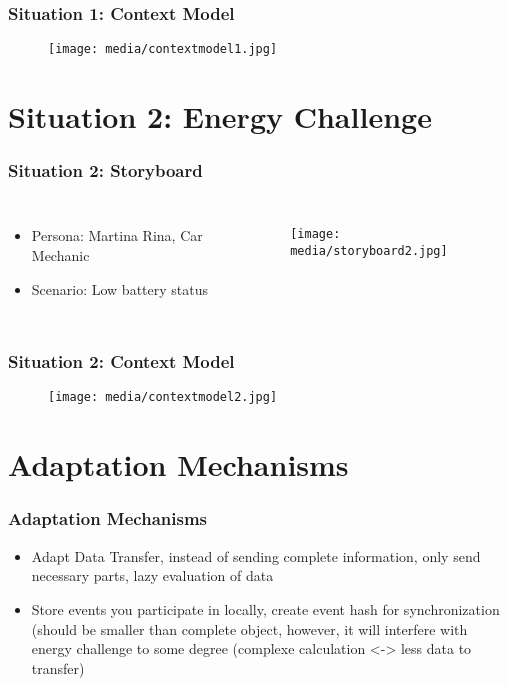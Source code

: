 \documentclass[aspectratio=169]{beamer}
\begin{document}
\begin{frame}
	\frametitle{Situation 1: Context Model}
	 \begin{figure}
		\centering
		\texttt{[image: media/contextmodel1.jpg]}
	\end{figure}
\end{frame}




\section{Situation 2:  Energy Challenge}
\begin{frame}   
	\frametitle{Situation 2:  Storyboard}
	\begin{columns}
		\begin{itemize}
			\item Persona: Martina Rina, Car Mechanic
			\item Scenario: Low battery status
		\end{itemize}
		 \begin{figure}
			\centering
			\texttt{[image: media/storyboard2.jpg]}
		\end{figure}
	\end{columns}
\end{frame}

\begin{frame}
	\frametitle{Situation 2: Context Model}
	 \begin{figure}
		\centering
		\texttt{[image: media/contextmodel2.jpg]}
	\end{figure}
\end{frame}


\section{Adaptation Mechanisms}
\begin{frame}   
	\frametitle{Adaptation Mechanisms}
	\begin{itemize}
		\item Adapt Data Transfer, instead of sending complete information, only send necessary parts, lazy evaluation of data
		\item Store events you participate in locally, create event hash for synchronization (should be smaller than complete object, however, it will interfere with energy challenge to some degree (complexe calculation <-> less data to transfer) 
	\end{itemize}
\end{frame}
\end{document}
